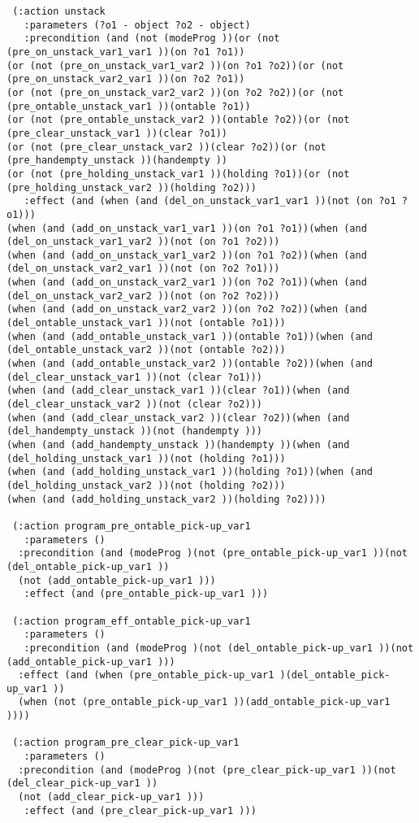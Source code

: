 \begin{scriptsize}
\begin{verbatim}
 (:action unstack
   :parameters (?o1 - object ?o2 - object)
   :precondition (and (not (modeProg ))(or (not (pre_on_unstack_var1_var1 ))(on ?o1 ?o1))
(or (not (pre_on_unstack_var1_var2 ))(on ?o1 ?o2))(or (not (pre_on_unstack_var2_var1 ))(on ?o2 ?o1))
(or (not (pre_on_unstack_var2_var2 ))(on ?o2 ?o2))(or (not (pre_ontable_unstack_var1 ))(ontable ?o1))
(or (not (pre_ontable_unstack_var2 ))(ontable ?o2))(or (not (pre_clear_unstack_var1 ))(clear ?o1))
(or (not (pre_clear_unstack_var2 ))(clear ?o2))(or (not (pre_handempty_unstack ))(handempty ))
(or (not (pre_holding_unstack_var1 ))(holding ?o1))(or (not (pre_holding_unstack_var2 ))(holding ?o2)))
   :effect (and (when (and (del_on_unstack_var1_var1 ))(not (on ?o1 ?o1)))
(when (and (add_on_unstack_var1_var1 ))(on ?o1 ?o1))(when (and (del_on_unstack_var1_var2 ))(not (on ?o1 ?o2)))
(when (and (add_on_unstack_var1_var2 ))(on ?o1 ?o2))(when (and (del_on_unstack_var2_var1 ))(not (on ?o2 ?o1)))
(when (and (add_on_unstack_var2_var1 ))(on ?o2 ?o1))(when (and (del_on_unstack_var2_var2 ))(not (on ?o2 ?o2)))
(when (and (add_on_unstack_var2_var2 ))(on ?o2 ?o2))(when (and (del_ontable_unstack_var1 ))(not (ontable ?o1)))
(when (and (add_ontable_unstack_var1 ))(ontable ?o1))(when (and (del_ontable_unstack_var2 ))(not (ontable ?o2)))
(when (and (add_ontable_unstack_var2 ))(ontable ?o2))(when (and (del_clear_unstack_var1 ))(not (clear ?o1)))
(when (and (add_clear_unstack_var1 ))(clear ?o1))(when (and (del_clear_unstack_var2 ))(not (clear ?o2)))
(when (and (add_clear_unstack_var2 ))(clear ?o2))(when (and (del_handempty_unstack ))(not (handempty )))
(when (and (add_handempty_unstack ))(handempty ))(when (and (del_holding_unstack_var1 ))(not (holding ?o1)))
(when (and (add_holding_unstack_var1 ))(holding ?o1))(when (and (del_holding_unstack_var2 ))(not (holding ?o2)))
(when (and (add_holding_unstack_var2 ))(holding ?o2))))

 (:action program_pre_ontable_pick-up_var1
   :parameters ()
  :precondition (and (modeProg )(not (pre_ontable_pick-up_var1 ))(not (del_ontable_pick-up_var1 ))
  (not (add_ontable_pick-up_var1 )))
   :effect (and (pre_ontable_pick-up_var1 )))

 (:action program_eff_ontable_pick-up_var1
   :parameters ()
   :precondition (and (modeProg )(not (del_ontable_pick-up_var1 ))(not (add_ontable_pick-up_var1 )))
  :effect (and (when (pre_ontable_pick-up_var1 )(del_ontable_pick-up_var1 ))
  (when (not (pre_ontable_pick-up_var1 ))(add_ontable_pick-up_var1 ))))

 (:action program_pre_clear_pick-up_var1
   :parameters ()
  :precondition (and (modeProg )(not (pre_clear_pick-up_var1 ))(not (del_clear_pick-up_var1 ))
  (not (add_clear_pick-up_var1 )))
   :effect (and (pre_clear_pick-up_var1 )))


\end{verbatim}
\end{scriptsize}
